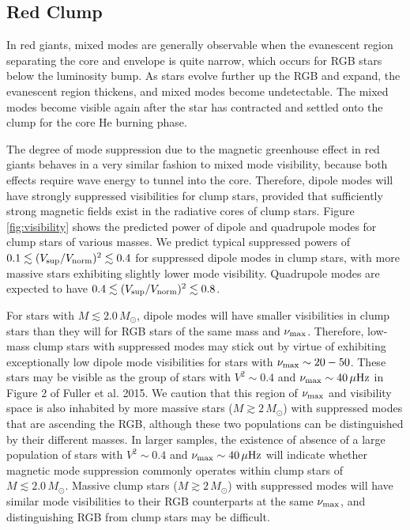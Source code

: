 \subsection{Red Clump}
\label{clump}
  

In red giants, mixed modes are generally observable when the evanescent region separating the core and envelope is quite narrow, which occurs for RGB stars below the luminosity bump. As stars evolve further up the RGB and expand, the evanescent region thickens, and mixed modes become undetectable. The mixed modes become visible again after the star has contracted and settled onto the clump for the core He burning phase. 

The degree of mode suppression due to the magnetic greenhouse effect in red giants behaves in a very similar fashion to mixed mode visibility, because both effects require wave energy to tunnel into the core. Therefore, dipole modes will have strongly suppressed visibilities for clump stars, provided that sufficiently strong magnetic fields exist in the radiative cores of clump stars. Figure \ref{fig:visibility} shows the predicted power of dipole and quadrupole modes for clump stars of various masses. We predict typical suppressed powers of $0.1 \lesssim (V_{\rm sup}/V_{\rm norm})^2 \lesssim 0.4$ for suppressed dipole modes in clump stars, with more massive stars exhibiting slightly lower mode visibility. Quadrupole modes are expected to have $0.4 \lesssim (V_{\rm sup}/V_{\rm norm})^2 \lesssim 0.8$. 

For stars with $M \lesssim 2.0 \, M_\odot$, dipole modes will have smaller visibilities in clump stars than they will for RGB stars of the same mass and $\nu_{\rm max}$. Therefore, low-mass clump stars with suppressed modes may stick out by virtue of exhibiting exceptionally low dipole mode visibilities for stars with $\nu_{\rm max} \sim 20-50$. These stars may be visible as the group of stars with $V^2 \sim 0.4$ and $\nu_{\rm max} \sim 40 \, \mu {\rm Hz}$ in Figure 2 of Fuller et al. 2015. We caution that this region of $\nu_{\rm max}$ and visibility space is also inhabited by more massive stars ($M \gtrsim 2 \, M_\odot$) with suppressed modes that are ascending the RGB, although these two populations can be distinguished by their different masses. In larger samples, the existence of absence of a large population of stars with $V^2 \sim 0.4$ and $\nu_{\rm max} \sim 40 \, \mu {\rm Hz}$ will indicate whether magnetic mode suppression commonly operates within clump stars of $M \lesssim 2.0 \, M_\odot$. Massive clump stars ($M \gtrsim 2 \, M_\odot$) with suppressed modes will have similar mode visibilities to their RGB counterparts at the same $\nu_{\rm max}$, and distinguishing RGB from clump stars may be difficult.
  
  
  
  
  